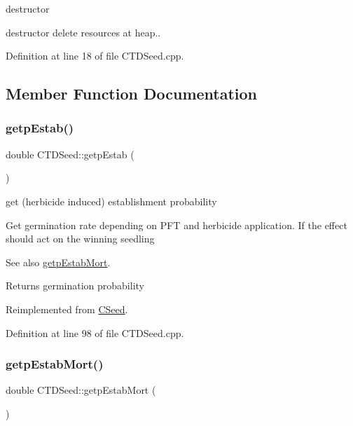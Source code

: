 destructor 

destructor delete resources at heap.. 

Definition at line 18 of file C\+T\+D\+Seed.\+cpp.



\subsection{Member Function Documentation}
\mbox{\label{class_c_t_d_seed_a0e62cd8894a79f484cdacfb026839609}} 
\subsubsection{\texorpdfstring{getpEstab()}{getpEstab()}}
{\footnotesize\ttfamily double C\+T\+D\+Seed\+::getp\+Estab (\begin{DoxyParamCaption}{ }\end{DoxyParamCaption})\hspace{0.3cm}{\ttfamily [virtual]}}



get (herbicide induced) establishment probability 

Get germination rate depending on P\+FT and herbicide application. If the effect should act on the winning seedling \begin{DoxySeeAlso}{See also}
\mbox{\hyperlink{class_c_t_d_seed_a94a46b8a2c8b176f3b39ee6671dd16bf}{getp\+Estab\+Mort}}. 
\end{DoxySeeAlso}
\begin{DoxyReturn}{Returns}
germination probability 
\end{DoxyReturn}


Reimplemented from \mbox{\hyperlink{class_c_seed_a6845f39091b1c9d8c31a9ee87ca8f8f0}{C\+Seed}}.



Definition at line 98 of file C\+T\+D\+Seed.\+cpp.

\mbox{\label{class_c_t_d_seed_a94a46b8a2c8b176f3b39ee6671dd16bf}} 
\subsubsection{\texorpdfstring{getpEstabMort()}{getpEstabMort()}}
{\footnotesize\ttfamily double C\+T\+D\+Seed\+::getp\+Estab\+Mort (\begin{DoxyParamCaption}{ }\end{DoxyParamCaption})\hspace{0.3cm}{\ttfamily [virtual]}}



